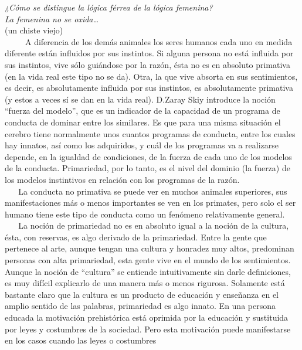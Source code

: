 \noindent
\textit{¿Cómo se distingue la lógica férrea de la lógica femenina?}\\
\textit{La femenina no se oxida\ldots{}}\\
(un chiste viejo)\\



~ ~ ~ A diferencia de los demás animales los seres humanos cada uno en
medida diferente están influidos por sus instintos. Si alguna persona no
está influida por sus instintos, vive sólo guiándose por la razón, ésta
no es en absoluto primativa (en la vida real este tipo no se da). Otra,
la que vive absorta en sus sentimientos, es decir, es absolutamente
influida por sus instintos, es absolutamente primativa (y estos a veces
sí se dan en la vida real). D.Zaray Skiy introduce la noción ``fuerza
del modelo'', que es un indicador de la capacidad de un programa de
conducta de dominar entre los similares. Es que para una misma situación
el cerebro tiene normalmente unos cuantos programas de conducta, entre
los cuales hay innatos, así como los adquiridos, y cuál de los programas
va a realizarse depende, en la igualdad de condiciones, de la fuerza de
cada uno de los modelos de la conducta. Primariedad, por lo tanto, es el
nivel del dominio (la fuerza) de los modelos instintivos en relación con
los programas de la razón.\\
\hspace*{0.333em} ~ ~ La conducta no primativa se puede ver en muchos
animales superiores, sus manifestaciones más o menos importantes se ven
en los primates, pero solo el ser humano tiene este tipo de conducta
como un fenómeno relativamente general.\\
\hspace*{0.333em} ~ ~ La noción de primariedad no es en absoluto igual a
la noción de la cultura, ésta, con reservas, es algo derivado de la
primariedad. Entre la gente que pertenece al arte, aunque tengan una
cultura y honradez muy altos, predominan personas con alta primariedad,
esta gente vive en el mundo de los sentimientos. Aunque la noción de
``cultura'' se entiende intuitivamente sin darle definiciones, es muy
difícil explicarlo de una manera más o menos rigurosa. Solamente está
bastante claro que la cultura es un producto de educación y enseñanza en
el amplio sentido de las palabras, primariedad es algo innato. En una
persona educada la motivación prehistórica está oprimida por la
educación y sustituida por leyes y costumbres de la sociedad. Pero esta
motivación puede manifestarse en los casos cuando las leyes o costumbres

